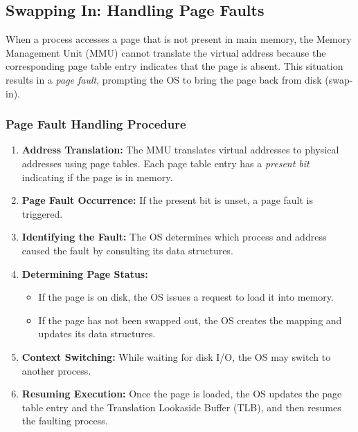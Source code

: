 \documentclass[../../compsys.tex]{subfiles}
\begin{document}
\subsection{Swapping In: Handling Page Faults}
When a process accesses a page that is not present in main memory, the Memory Management Unit (MMU) cannot translate the virtual address because the corresponding page table entry indicates that the page is absent. This situation results in a \emph{page fault}, prompting the OS to bring the page back from disk (swap-in).

\subsubsection{Page Fault Handling Procedure}
\begin{enumerate}
    \item \textbf{Address Translation:} The MMU translates virtual addresses to physical addresses using page tables. Each page table entry has a \textit{present bit} indicating if the page is in memory.
    \item \textbf{Page Fault Occurrence:} If the present bit is unset, a page fault is triggered.
    \item \textbf{Identifying the Fault:} The OS determines which process and address caused the fault by consulting its data structures.
    \item \textbf{Determining Page Status:}
    \begin{itemize}
        \item If the page is on disk, the OS issues a request to load it into memory.
        \item If the page has not been swapped out, the OS creates the mapping and updates its data structures.
    \end{itemize}
    \item \textbf{Context Switching:} While waiting for disk I/O, the OS may switch to another process.
    \item \textbf{Resuming Execution:} Once the page is loaded, the OS updates the page table entry and the Translation Lookaside Buffer (TLB), and then resumes the faulting process.
\end{enumerate}
\end{document}
